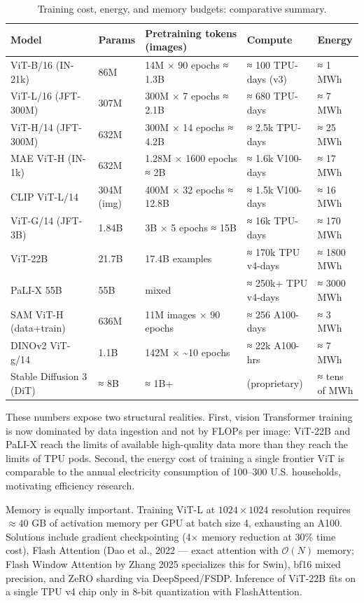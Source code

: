 \documentclass{article}
\begin{document}
\begin{table}[t]
\centering
\caption{Training cost, energy, and memory budgets: comparative summary.}
\label{tab:training-cost-energy-and-memory-budgets}
\begin{tabular}{>{\raggedright\arraybackslash}p{0.2581\linewidth}
  >{\raggedright\arraybackslash}p{0.1075\linewidth}
  >{\raggedright\arraybackslash}p{0.2903\linewidth}
  >{\raggedright\arraybackslash}p{0.2043\linewidth}
  >{\raggedright\arraybackslash}p{0.1398\linewidth}}
\toprule
Model & Params & Pretraining tokens (images) & Compute & Energy \\
\midrule
ViT-B/16 (IN-21k) & 86M & 14M × 90 epochs ≈ 1.3B & ≈ 100 TPU-days (v3) & ≈ 1 MWh \\
ViT-L/16 (JFT-300M) & 307M & 300M × 7 epochs ≈ 2.1B & ≈ 680 TPU-days & ≈ 7 MWh \\
ViT-H/14 (JFT-300M) & 632M & 300M × 14 epochs ≈ 4.2B & ≈ 2.5k TPU-days & ≈ 25 MWh \\
MAE ViT-H (IN-1k) & 632M & 1.28M × 1600 epochs ≈ 2B & ≈ 1.6k V100-days & ≈ 17 MWh \\
CLIP ViT-L/14 & 304M (img) & 400M × 32 epochs ≈ 12.8B & ≈ 1.5k V100-days & ≈ 16 MWh \\
ViT-G/14 (JFT-3B) & 1.84B & 3B × 5 epochs ≈ 15B & ≈ 16k TPU-days & ≈ 170 MWh \\
ViT-22B & 21.7B & 17.4B examples & ≈ 170k TPU v4-days & ≈ 1800 MWh \\
PaLI-X 55B & 55B & mixed & ≈ 250k+ TPU v4-days & ≈ 3000 MWh \\
SAM ViT-H (data+train) & 636M & 11M images × 90 epochs & ≈ 256 A100-days & ≈ 3 MWh \\
DINOv2 ViT-g/14 & 1.1B & 142M × \textasciitilde10 epochs & ≈ 22k A100-hrs & ≈ 7 MWh \\
Stable Diffusion 3 (DiT) & ≈ 8B & ≈ 1B+ & (proprietary) & ≈ tens of MWh \\
\end{tabular}
\end{table}

These numbers expose two structural realities. First, vision Transformer training is now dominated by data ingestion and not by FLOPs per image: ViT-22B and PaLI-X reach the limits of available high-quality data more than they reach the limits of TPU pods. Second, the energy cost of training a single frontier ViT is comparable to the annual electricity consumption of 100--300 U.S. households, motivating efficiency research.

Memory is equally important. Training ViT-L at \(1024 \times 1024\) resolution requires \(\approx 40\) GB of activation memory per GPU at batch size 4, exhausting an A100. Solutions include gradient checkpointing (4× memory reduction at 30\% time cost), Flash Attention (Dao et al., 2022 --- exact attention with \(\mathcal{O}(N)\) memory; Flash Window Attention by Zhang 2025 specializes this for Swin), bf16 mixed precision, and ZeRO sharding via DeepSpeed/FSDP. Inference of ViT-22B fits on a single TPU v4 chip only in 8-bit quantization with FlashAttention.
\end{document}
